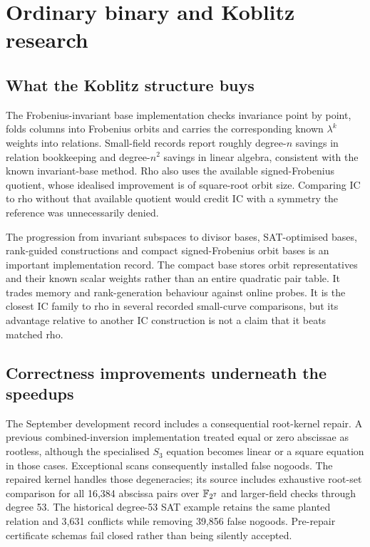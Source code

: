 \section{Ordinary binary and Koblitz research}\label{sec:binary}

\subsection{What the Koblitz structure buys}

The Frobenius-invariant base implementation checks invariance point by
point, folds columns into Frobenius orbits and carries the corresponding
known $\lambda^k$ weights into relations. Small-field records report
roughly degree-$n$ savings in relation bookkeeping and degree-$n^2$
savings in linear algebra, consistent with the known invariant-base
method. Rho also uses the available signed-Frobenius quotient, whose
idealised improvement is of square-root orbit size. Comparing IC to rho
without that available quotient would credit IC with a symmetry the
reference was unnecessarily denied.\cite{ggmp2020}

The progression from invariant subspaces to divisor bases, SAT-optimised
bases, rank-guided constructions and compact signed-Frobenius orbit bases
is an important implementation record. The compact base stores orbit
representatives and their known scalar weights rather than an entire
quadratic pair table. It trades memory and rank-generation behaviour
against online probes. It is the closest IC family to rho in several
recorded small-curve comparisons, but its advantage relative to another
IC construction is not a claim that it beats matched rho.

\subsection{Correctness improvements underneath the speedups}

The September development record includes a consequential root-kernel
repair. A previous combined-inversion implementation treated equal or
zero abscissae as rootless, although the specialised $S_3$ equation becomes
linear or a square equation in those cases. Exceptional scans consequently
installed false nogoods. The repaired kernel handles those degeneracies;
its source includes exhaustive root-set comparison for all 16,384
abscissa pairs over $\mathbb F_{2^7}$ and larger-field checks through degree 53.
The historical degree-53 SAT example retains the same planted relation and
3,631 conflicts while removing 39,856 false nogoods. Pre-repair certificate
schemas fail closed rather than being silently accepted.

